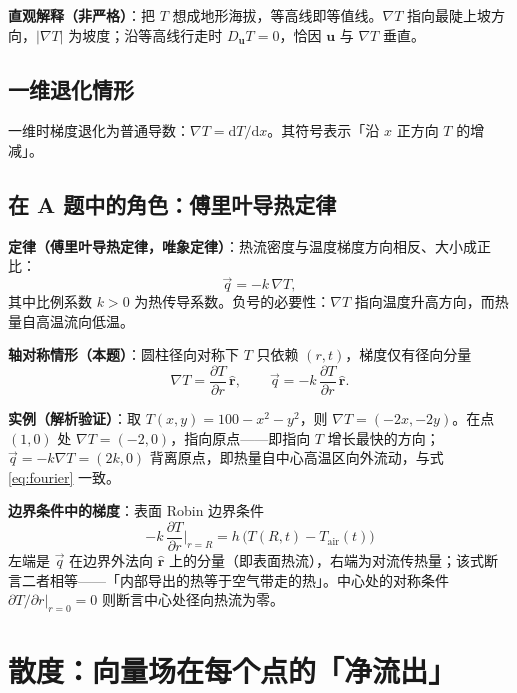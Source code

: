 \documentclass[12pt,a4paper]{ctexart}
\begin{document}
\textbf{直观解释（非严格）}：把 $T$ 想成地形海拔，等高线即等值线。$\nabla T$ 指向最陡上坡方向，$|\nabla T|$ 为坡度；沿等高线行走时 $D_{\boldsymbol u}T=0$，恰因 $\boldsymbol u$ 与 $\nabla T$ 垂直。

\subsection{一维退化情形}

一维时梯度退化为普通导数：$\nabla T=\mathrm{d}T/\mathrm{d}x$。其符号表示「沿 $x$ 正方向 $T$ 的增减」。

\subsection{在 A 题中的角色：傅里叶导热定律}

\textbf{定律（傅里叶导热定律，唯象定律）}：热流密度与温度梯度方向相反、大小成正比：
\begin{equation}
\vec{q}=-k\,\nabla T,
\label{eq:fourier}
\end{equation}
其中比例系数 $k>0$ 为热传导系数。负号的必要性：$\nabla T$ 指向温度升高方向，而热量自高温流向低温。

\textbf{轴对称情形（本题）}：圆柱径向对称下 $T$ 只依赖 $(r,t)$，梯度仅有径向分量
\begin{equation}
\nabla T=\frac{\partial T}{\partial r}\,\hat{\boldsymbol r},
\qquad
\vec{q}=-k\,\frac{\partial T}{\partial r}\,\hat{\boldsymbol r}.
\label{eq:grad-cyl}
\end{equation}

\textbf{实例（解析验证）}：取 $T(x,y)=100-x^2-y^2$，则 $\nabla T=(-2x,-2y)$。在点 $(1,0)$ 处 $\nabla T=(-2,0)$，指向原点——即指向 $T$ 增长最快的方向；$\vec{q}=-k\nabla T=(2k,0)$ 背离原点，即热量自中心高温区向外流动，与式 \eqref{eq:fourier} 一致。

\textbf{边界条件中的梯度}：表面 Robin 边界条件
\begin{equation}
-k\,\frac{\partial T}{\partial r}\bigg|_{r=R}=h\,\big(T(R,t)-T_{\mathrm{air}}(t)\big)
\end{equation}
左端是 $\vec{q}$ 在边界外法向 $\hat{\boldsymbol r}$ 上的分量（即表面热流），右端为对流传热量；该式断言二者相等——「内部导出的热等于空气带走的热」。中心处的对称条件 $\partial T/\partial r\big|_{r=0}=0$ 则断言中心处径向热流为零。

\section{散度：向量场在每个点的「净流出」}
\end{document}
